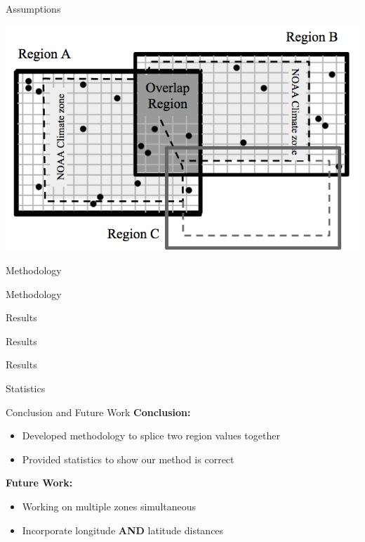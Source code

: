 \documentclass{beamer}
\begin{document}
\begin{frame}{Assumptions}
\vspace{-5mm}
\begin{center}
\includegraphics[width=1.0\textwidth]{overlap.png}
\end{center}
\end{frame}

\begin{frame}{Methodology}

\end{frame}

\begin{frame}{Methodology}

\end{frame}


\begin{frame}{Results}

\end{frame}

\begin{frame}{Results}

\end{frame}

\begin{frame}{Results}

\end{frame}

\begin{frame}{Statistics}

\end{frame}

\begin{frame}{Conclusion and Future Work}
\textbf{Conclusion:}
\begin{itemize}
\item Developed methodology to splice two region values together
\item Provided statistics to show our method is correct
\end{itemize}
\vspace{9mm}
\textbf{Future Work:}
\begin{itemize}
\item Working on multiple zones simultaneous
\item Incorporate longitude \textbf{AND} latitude distances
\end{itemize}

\end{frame}
\end{document}

